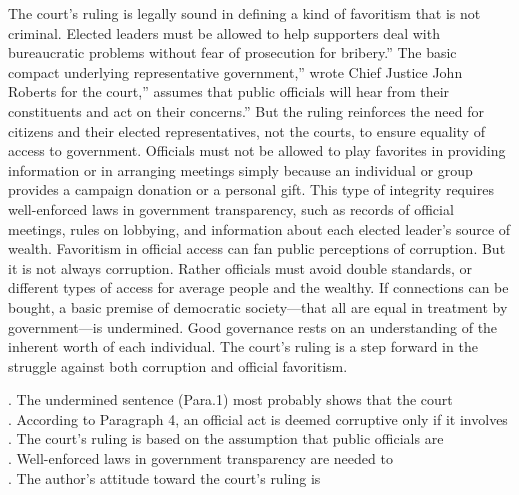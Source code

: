 The court’s ruling is legally sound in defining a kind of favoritism that is not criminal. Elected leaders must be allowed to help supporters deal with bureaucratic problems without fear of prosecution for bribery.” The basic compact underlying representative government,” wrote Chief Justice John Roberts for the court,” assumes that public officials will hear from their constituents and act on their concerns.” 
But the ruling reinforces the need for citizens and their elected representatives, not the courts, to ensure equality of access to government. Officials must not be allowed to play favorites in providing information or in arranging meetings simply because an individual or group provides a campaign donation or a personal gift. This type of integrity requires well-enforced laws in government transparency, such as records of official meetings, rules on lobbying, and information about each elected leader’s source of wealth. 
Favoritism in official access can fan public perceptions of corruption. But it is not always corruption. Rather officials must avoid double standards, or different types of access for average people and the wealthy. If connections can be bought, a basic premise of democratic society—that all are equal in treatment by government—is undermined. Good governance rests on an understanding of the inherent worth of each individual. 
The court’s ruling is a step forward in the struggle against both corruption and official favoritism. 
\begin{questions} . The undermined sentence (Para.1) most probably shows that the court 
\\ . According to Paragraph 4, an official act is deemed corruptive only if it involves 
\\ . The court’s ruling is based on the assumption that public officials are 
\\ . Well-enforced laws in government transparency are needed to 
\\ . The author’s attitude toward the court’s ruling is 
\\ \end{questions}    